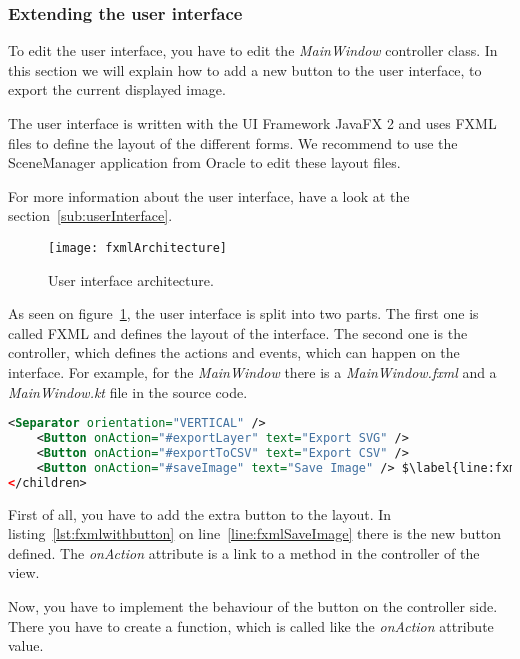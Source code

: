 \subsubsection{Extending the user interface}

To edit the user interface, you have to edit the \textit{MainWindow} controller class. In this section we will explain how to add a new button to the user interface, to export the current displayed image.

The user interface is written with the UI Framework JavaFX 2 and uses FXML files to define the layout of the different forms. We recommend to use the SceneManager application from Oracle to edit these layout files.

For more information about the user interface, have a look at the section~\ref{sub:userInterface}.

\begin{figure}[H]
	\centering
	\texttt{[image: fxmlArchitecture]}
	\caption{User interface architecture.}
	\label{fig:fxmlArchitecture}
\end{figure}

As seen on figure~\ref{fig:fxmlArchitecture}, the user interface is split into two parts. The first one is called FXML and defines the layout of the interface. The second one is the controller, which defines the actions and events, which can happen on the interface. For example, for the \textit{MainWindow} there is a \textit{MainWindow.fxml} and a \textit{MainWindow.kt} file in the source code.

\begin{lstlisting}[caption={MainWindow.fxml with new button.}, label={lst:fxmlwithbutton}, language=XML, escapechar=$]
    <Separator orientation="VERTICAL" />
    <Button onAction="#exportLayer" text="Export SVG" />
    <Button onAction="#exportToCSV" text="Export CSV" />
    <Button onAction="#saveImage" text="Save Image" /> $\label{line:fxmlSaveImage}$
</children>
\end{lstlisting}

First of all, you have to add the extra button to the layout. In listing~\ref{lst:fxmlwithbutton} on line~\ref{line:fxmlSaveImage} there is the new button defined. The \textit{onAction} attribute is a link to a method in the controller of the view.

Now, you have to implement the behaviour of the button on the controller side. There you have to create a function, which is called like the \textit{onAction} attribute value.

